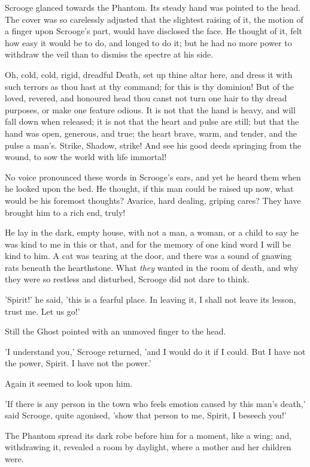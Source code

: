 Scrooge glanced towards the Phantom. Its steady hand was pointed to the
head. The cover was so carelessly adjusted that the slightest raising of
it, the motion of a finger upon Scrooge's part, would have disclosed the
face. He thought of it, felt how easy it would be to do, and longed to
do it; but he had no more power to withdraw the veil than to dismiss the
spectre at his side.

Oh, cold, cold, rigid, dreadful Death, set up thine altar here, and
dress it with such terrors as thou hast at thy command; for this is thy
dominion! But of the loved, revered, and honoured head thou canst not
turn one hair to thy dread purposes, or make one feature odious. It is
not that the hand is heavy, and will fall down when released; it is not
that the heart and pulse are still; but that the hand was open,
generous, and true; the heart brave, warm, and tender, and the pulse a
man's. Strike, Shadow, strike! And see his good deeds springing from the
wound, to sow the world with life immortal!

No voice pronounced these words in Scrooge's ears, and yet he heard them
when he looked upon the bed. He thought, if this man could be raised up
now, what would be his foremost thoughts? Avarice, hard dealing, griping
cares? They have brought him to a rich end, truly!

He lay in the dark, empty house, with not a man, a woman, or a child to
say he was kind to me in this or that, and for the memory of one kind
word I will be kind to him. A cat was tearing at the door, and there was
a sound of gnawing rats beneath the hearthstone. What \emph{they} wanted in
the room of death, and why they were so restless and disturbed, Scrooge
did not dare to think.

'Spirit!' he said, 'this is a fearful place. In leaving it, I shall not
leave its lesson, trust me. Let us go!'

Still the Ghost pointed with an unmoved finger to the head.

'I understand you,' Scrooge returned, 'and I would do it if I could. But
I have not the power, Spirit. I have not the power.'

Again it seemed to look upon him.

'If there is any person in the town who feels emotion caused by this
man's death,' said Scrooge, quite agonised, 'show that person to me,
Spirit, I beseech you!'

The Phantom spread its dark robe before him for a moment, like a wing;
and, withdrawing it, revealed a room by daylight, where a mother and her
children were.

